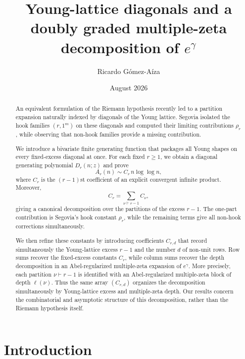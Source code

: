 \documentclass[11pt]{article}
\title{\textbf{Young-lattice diagonals and a doubly graded multiple-zeta decomposition of $e^\gamma$}
}
\author{Ricardo G\'omez-A\'iza}
\date{August 2026}
\theoremstyle{definition}
\begin{document}
\maketitle

\begin{abstract}
An equivalent formulation of the Riemann hypothesis recently led to a
partition expansion naturally indexed by diagonals of the Young lattice.
Segovia isolated the hook families $(r,1^m)$ on these diagonals and
computed their limiting contributions $\rho_r$, while observing that
non-hook families provide a missing contribution.

We introduce a bivariate finite generating function that packages all
Young shapes on every fixed-excess diagonal at once.  For each fixed
$r\geq1$, we obtain a diagonal generating polynomial $D_r(n;z)$ and prove
\[
        A_r(n)\sim C_r\,n\log\log n,
\]
where $C_r$ is the $(r-1)$st coefficient of an explicit convergent
infinite product.  Moreover,
\[
        C_r=\sum_{\nu\vdash r-1} C_\nu ,
\]
giving a canonical decomposition over the partitions of the excess
$r-1$.  The one-part contribution is Segovia's hook constant $\rho_r$,
while the remaining terms give all non-hook corrections simultaneously.

We then refine these constants by introducing coefficients $C_{r,d}$
that record simultaneously the Young-lattice excess $r-1$ and the
number $d$ of non-unit rows.  Row sums recover the fixed-excess constants
$C_r$, while column sums recover the depth decomposition in an
Abel-regularized multiple-zeta expansion of $e^\gamma$.  More precisely,
each partition $\nu\vdash r-1$ is identified with an Abel-regularized
multiple-zeta block of depth $\ell(\nu)$.  Thus the same array
$(C_{r,d})$ organizes the decomposition simultaneously by Young-lattice
excess and multiple-zeta depth.  Our results concern the combinatorial
and asymptotic structure of this decomposition, rather than the Riemann
hypothesis itself.
\end{abstract}

\section{Introduction}
\end{document}
